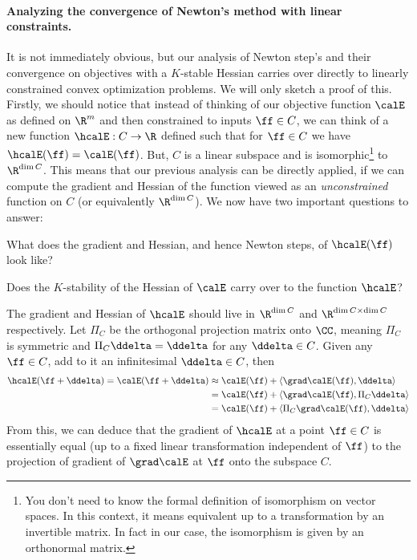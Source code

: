 \paragraph{Analyzing the convergence of Newton's method with linear
  constraints.}
It is not immediately obvious, but our analysis of Newton step's and
their convergence on objectives with a $K$-stable Hessian carries over
directly to linearly constrained convex optimization
problems.
We will only sketch a proof of this.
Firstly, we should notice that instead of thinking of our objective function
$\calE$ as defined on $\R^m$ and then constrained to inputs $\ff \in
C$, we can think of a new function $\hcalE: C \to \R$ defined such
that for $\ff \in C$ we have $\hcalE(\ff) = \calE(\ff)$.
But, $C$ is a linear subspace and is isomorphic\footnote{You don't
  need to know the formal definition of isomorphism on vector
  spaces. In this context, it means equivalent up to a
  transformation by an invertible matrix. In fact in our case, the isomorphism
is given by an orthonormal matrix.} to $\R^{\dim{C}}$.
This means that our previous analysis can be directly applied, if we
can compute the gradient and Hessian of the function viewed as an
\emph{unconstrained} function on $C$ (or equivalently
$\R^{\dim{C}}$).
We now have two important questions to answer:
\begin{tight_enumerate}
\item What does the gradient and Hessian, and hence Newton steps, of
  $\hcalE(\ff)$ look like? 
\item Does the $K$-stability of the Hessian of $\calE$ carry over to
  the function $\hcalE$?
\end{tight_enumerate}
The gradient and Hessian of $\hcalE$ should live in $\R^{\dim C}$ and
$\R^{\dim C \times \dim C}$ respectively.
Let $\Pi_C$ be the orthogonal projection matrix onto $\CC$, meaning $\Pi_C$ is symmetric and $\Pi_C\ddelta=\ddelta$ for any $\ddelta\in C$.
Given any $\ff \in C$, add to it an infinitesimal $\ddelta\in C$, then
\begin{align*}
  \hcalE(\ff+\ddelta)=
  \calE(\ff+\ddelta) &\approx \calE(\ff) + \langle\grad\calE(\ff),\ddelta\rangle \\
  &= \calE(\ff) + \langle\grad\calE(\ff),\Pi_C\ddelta\rangle \\
 &= \calE(\ff) + \langle\Pi_C\grad\calE(\ff),\ddelta\rangle
\end{align*}
From this, we can deduce that the gradient of $\hcalE$ at a point
$\ff\in C$ is essentially equal (up to a fixed linear transformation
independent of $\ff$) to the projection of gradient of $\grad\calE$ at $\ff$ onto the subspace $C$.

